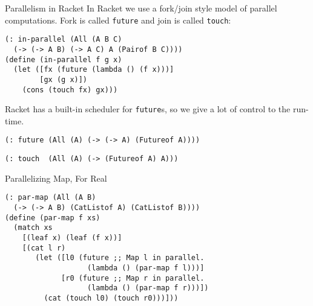 \documentclass{beamer}
\begin{document}
\begin{frame}[fragile]{Parallelism in Racket}
In Racket we use a fork/join style model of parallel computations. Fork is called \lstinline{future} and join is called \lstinline{touch}:

\begin{lstlisting}
(: in-parallel (All (A B C)
  (-> (-> A B) (-> A C) A (Pairof B C))))
(define (in-parallel f g x)
  (let ([fx (future (lambda () (f x)))]
        [gx (g x)])
    (cons (touch fx) gx)))
\end{lstlisting}

\pause{} \vspace{.5cm}

Racket has a built-in scheduler for \lstinline{future}s, so we give a lot of control to the run-time.

\lstinline{(: future (All (A) (-> (-> A) (Futureof A))))}

\lstinline{(: touch  (All (A) (-> (Futureof A) A)))}
\end{frame}

\begin{frame}[fragile]{Parallelizing Map, For Real}
\begin{lstlisting}
(: par-map (All (A B)
  (-> (-> A B) (CatListof A) (CatListof B))))
(define (par-map f xs)
  (match xs
    [(leaf x) (leaf (f x))]
    [(cat l r)
       (let ([l0 (future ;; Map l in parallel.
                   (lambda () (par-map f l)))]
             [r0 (future ;; Map r in parallel.
                   (lambda () (par-map f r)))])
         (cat (touch l0) (touch r0)))]))
\end{lstlisting}
\end{frame}
\end{document}
